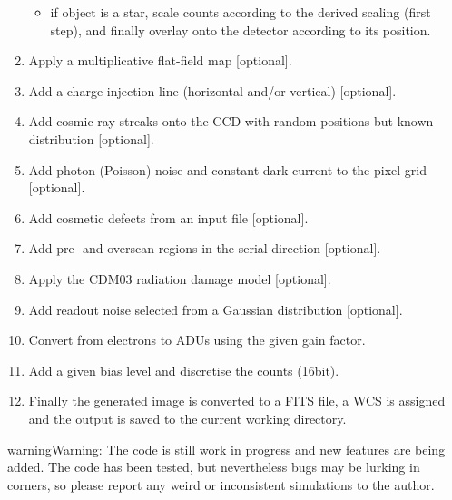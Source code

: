 \documentclass[a4paper,12pt,english]{sphinxmanual}
\begin{document}
\begin{enumerate}
\begin{itemize}
\item {} 
if object is a star, scale counts according to the derived
scaling (first step), and finally overlay onto the detector according to its position.

\end{itemize}

\item {} 
Apply a multiplicative flat-field map {[}optional{]}.

\item {} 
Add a charge injection line (horizontal and/or vertical) {[}optional{]}.

\item {} 
Add cosmic ray streaks onto the CCD with random positions but known distribution {[}optional{]}.

\item {} 
Add photon (Poisson) noise and constant dark current to the pixel grid {[}optional{]}.

\item {} 
Add cosmetic defects from an input file {[}optional{]}.

\item {} 
Add pre- and overscan regions in the serial direction {[}optional{]}.

\item {} 
Apply the CDM03 radiation damage model {[}optional{]}.

\item {} 
Add readout noise selected from a Gaussian distribution {[}optional{]}.

\item {} 
Convert from electrons to ADUs using the given gain factor.

\item {} 
Add a given bias level and discretise the counts (16bit).

\item {} 
Finally the generated image is converted to a FITS file, a WCS is assigned
and the output is saved to the current working directory.

\end{enumerate}

\begin{notice}{warning}{Warning:}
The code is still work in progress and new features are being added.
The code has been tested, but nevertheless bugs may be lurking in corners, so
please report any weird or inconsistent simulations to the author.
\end{notice}
\end{document}
